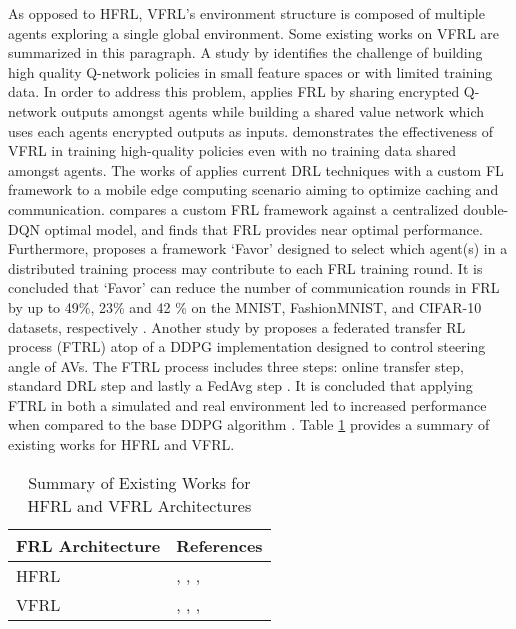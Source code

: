 As opposed to HFRL, VFRL's environment structure is composed of multiple agents exploring
a single global environment. Some existing works on VFRL are summarized in this paragraph.
A study by \cite{Zhuo2019} identifies the challenge of building high quality Q-network policies in
small feature spaces or with limited training data.  In order to address this problem, \cite{Zhuo2019} applies FRL
by sharing encrypted Q-network outputs amongst agents while building a
shared value network which uses each agents encrypted outputs as inputs.
\cite{Zhuo2019} demonstrates the effectiveness of VFRL in training high-quality policies
even with no training data shared amongst agents.
The works of \cite{Wang2018a} applies current DRL techniques with a custom FL framework to a mobile edge computing scenario
aiming to optimize caching and communication. \cite{Wang2018a} compares a custom FRL
framework against a centralized double-DQN optimal model, and finds
that FRL provides near optimal performance.  Furthermore, \cite{Wang2020a} proposes a framework
`Favor' designed to select which agent(s) in a distributed
training process may contribute to each FRL training round. It is concluded that `Favor' can reduce
the number of communication rounds in FRL by up to 49\%, 23\% and 42 \% on the MNIST, FashionMNIST, and CIFAR-10
datasets, respectively \cite{Wang2020a}. Another study by \cite{Liang2019} proposes a federated transfer
RL process (FTRL) atop of a DDPG implementation designed to control steering angle of AVs.
The FTRL process includes three steps: online
transfer step, standard DRL step and lastly a FedAvg step \cite{Liang2019}.
It is concluded that applying FTRL in both a simulated and real environment led to increased
performance when compared to the base DDPG algorithm \cite{Liang2019}.  Table \ref{tab:HFRLVFRLworks} provides a summary of existing
works for HFRL and VFRL.


\begin{table}[H]
  \centering
  \caption{Summary of Existing Works for HFRL and VFRL Architectures}
    \begin{tabular}{ll} \toprule
    \textbf{FRL Architecture} & \textbf{References} \\ \midrule
    \midrule
    HFRL & \cite{Lim2020}, \cite{Nadiger2019}, \cite{Liu2019b}, \cite{Ren2019} \\
    VFRL & \cite{Zhuo2019}, \cite{Wang2018a}, \cite{Wang2020a}, \cite{Liang2019} \\ \bottomrule
    \end{tabular}%
  \label{tab:HFRLVFRLworks}%
\end{table}%

